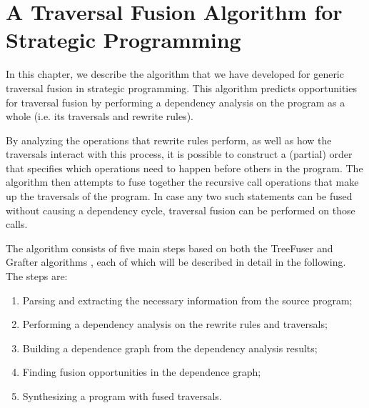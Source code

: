 

\chapter{\label{chap:solution}A Traversal Fusion Algorithm for Strategic Programming}

In this chapter, we describe the algorithm that we have developed for generic traversal fusion in strategic programming. This algorithm predicts opportunities for traversal fusion by performing a dependency analysis on the program as a whole (i.e. its traversals and rewrite rules).

By analyzing the operations that rewrite rules perform, as well as how the traversals interact with this process, it is possible to construct a (partial) order that specifies which operations need to happen before others in the program. The algorithm then attempts to fuse together the recursive call operations that make up the traversals of the program. In case any two such statements can be fused without causing a dependency cycle, traversal fusion can be performed on those calls.

The algorithm consists of five main steps based on both the TreeFuser and Grafter algorithms \cite{SakkaS017, SakkaSN019}, each of which will be described in detail in the following. The steps are:
\begin{enumerate}
    \item Parsing and extracting the necessary information from the source program;
    \item Performing a dependency analysis on the rewrite rules and traversals;
    \item Building a dependence graph from the dependency analysis results;
    \item Finding fusion opportunities in the dependence graph;
    \item Synthesizing a program with fused traversals.
\end{enumerate}


